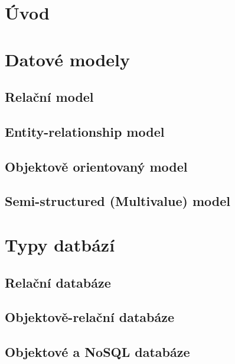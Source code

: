 
\section{Úvod}
\section{Datové modely}
\subsection{Relační model}
\subsection{Entity-relationship model}
\subsection{Objektově orientovaný model}
\subsection{Semi-structured (Multivalue) model}
\section{Typy datbází}
\subsection{Relační databáze}
\subsection{Objektově-relační databáze}
\subsection{Objektové a NoSQL databáze}
